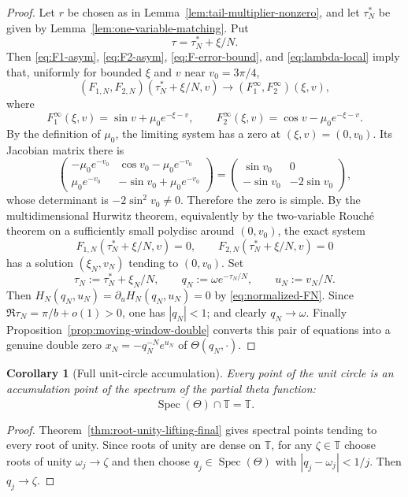 \documentclass[11pt,a4paper,reqno]{amsart}
\newtheorem{corollary}[theorem]{Corollary}
\theoremstyle{remark}
\newcommand{\T}{\mathbb T}
\newcommand{\Spec}{\operatorname{Spec}}
\begin{document}
\begin{proof}
Let $r$ be chosen as in Lemma~\ref{lem:tail-multiplier-nonzero}, and let $\tau_N^*$ be given by Lemma~\ref{lem:one-variable-matching}.  Put
\[
        \tau=\tau_N^*+\xi/N.
\]
Then \eqref{eq:F1-asym}, \eqref{eq:F2-asym}, \eqref{eq:F-error-bound}, and \eqref{eq:lambda-local} imply that, uniformly for bounded $\xi$ and $v$ near $v_0=3\pi/4$,
\[
        (F_{1,N},F_{2,N})(\tau_N^*+\xi/N,v)
        \longrightarrow
        (F_1^\infty,F_2^\infty)(\xi,v),
\]
where
\[
        F_1^\infty(\xi,v)=\sin v+\mu_0e^{-\xi-v},
        \qquad
        F_2^\infty(\xi,v)=\cos v-\mu_0e^{-\xi-v}.
\]
By the definition of $\mu_0$, the limiting system has a zero at $(\xi,v)=(0,v_0)$.  Its Jacobian matrix there is
\[
        \begin{pmatrix}
        -\mu_0e^{-v_0} & \cos v_0-\mu_0e^{-v_0}\\
        \mu_0e^{-v_0} & -\sin v_0+\mu_0e^{-v_0}
        \end{pmatrix}
        =
        \begin{pmatrix}
        \sin v_0 & 0\\
        -\sin v_0 & -2\sin v_0
        \end{pmatrix},
\]
whose determinant is $-2\sin^2v_0\ne0$.  Therefore the zero is simple.  By the multidimensional Hurwitz theorem, equivalently by the two-variable Rouch\'e theorem on a sufficiently small polydisc around $(0,v_0)$, the exact system
\[
        F_{1,N}(\tau_N^*+\xi/N,v)=0,
        \qquad
        F_{2,N}(\tau_N^*+\xi/N,v)=0
\]
has a solution $(\xi_N,v_N)$ tending to $(0,v_0)$.  Set
\[
        \tau_N:=\tau_N^*+\xi_N/N,
        \qquad
        q_N:=\omega e^{-\tau_N/N},
        \qquad
        u_N:=v_N/N.
\]
Then $H_N(q_N,u_N)=\partial_uH_N(q_N,u_N)=0$ by \eqref{eq:normalized-FN}.  Since $\Re\tau_N=\pi/b+o(1)>0$, one has $|q_N|<1$; and clearly $q_N\to\omega$.  Finally Proposition~\ref{prop:moving-window-double} converts this pair of equations into a genuine double zero $x_N=-q_N^{-N}e^{u_N}$ of $\Theta(q_N,\cdot)$.
\end{proof}

\begin{corollary}[Full unit-circle accumulation]\label{cor:full-unit-circle-accumulation}
Every point of the unit circle is an accumulation point of the spectrum of the partial theta function:
\[
        \overline{\Spec(\Theta)}\cap\T=\T.
\]
\end{corollary}

\begin{proof}
Theorem~\ref{thm:root-unity-lifting-final} gives spectral points tending to every root of unity.  Since roots of unity are dense on $\T$, for any $\zeta\in\T$ choose roots of unity $\omega_j\to\zeta$ and then choose $q_j\in\Spec(\Theta)$ with $|q_j-\omega_j|<1/j$.  Then $q_j\to\zeta$.
\end{proof}
\end{document}

